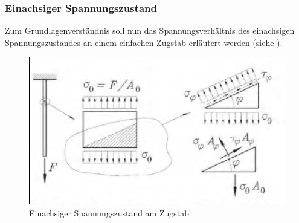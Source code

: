 \documentclass[12pt,a4paper,parskip,twoside,BCOR5mm,headsepline]{scrartcl}
\begin{document}
\begin{description*}
\subsubsection{Einachsiger Spannungszustand}
Zum Grundlagenverständnis soll nun das Spannungsverhältnis des einachsigen Spannungszustandes an einem einfachen Zugstab erläutert werden (siehe ).
\begin{figure}
\centering
\includegraphics[width=.8\textwidth]{einachsspann}
\caption[Einachsiger Spannungszustand ]{Einachsiger Spannungszustand am Zugstab\autocite[388]{dd}}
\label{fig:einachsspann} 
\end{figure}


\end{description*}
\end{document}
